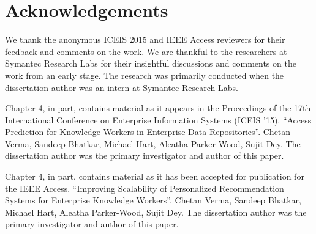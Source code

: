 



\section{Acknowledgements}
\label{sec:ack}
We thank the anonymous ICEIS 2015 and IEEE Access reviewers for their feedback and comments on the work. We are thankful to the researchers at Symantec Research Labs for their insightful discussions and comments on the work from an early stage. The research was primarily conducted when the dissertation author was an intern at Symantec Research Labs. 

Chapter 4, in part, contains material as it appears in the Proceedings of the 17th International Conference on Enterprise Information Systems (ICEIS '15). ``Access Prediction for Knowledge Workers in Enterprise Data Repositories''. Chetan Verma, Sandeep Bhatkar, Michael Hart, Aleatha Parker-Wood, Sujit Dey. The dissertation author was the primary investigator and author of this paper. 

Chapter 4, in part, contains material as it has been accepted for publication for the IEEE Access. ``Improving Scalability of Personalized Recommendation Systems for Enterprise Knowledge Workers''. Chetan Verma, Sandeep Bhatkar, Michael Hart, Aleatha Parker-Wood, Sujit Dey. The dissertation author was the primary investigator and author of this paper. 
